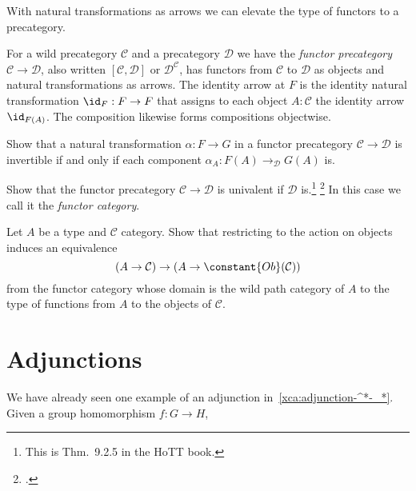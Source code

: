 With natural transformations as arrows we can elevate the
type of functors to a precategory.
\begin{definition}
  For a wild precategory $\mathcal C$ and a precategory $\mathcal D$
  we have the \emph{functor precategory}%
  $\mathcal C \to \mathcal D$, also written
  $[\mathcal C,\mathcal D]$ or $\mathcal D^{\mathcal C}$, %
  has functors from $\mathcal C$ to $\mathcal D$ as objects
  and natural transformations as arrows.
  The identity arrow at $F$ is the identity natural transformation
  $\id_F: F \to F$ that assigns to each object $A:\mathcal C$ the identity
  arrow $\id_{F(A)}$.
  The composition likewise forms compositions objectwise.
\end{definition}
\begin{xca}
  Show that a natural transformation $\alpha : F \to G$
  in a functor precategory $\mathcal C\to\mathcal D$
  is invertible if and only if
  each component $\alpha_A : F(A) \to_{\mathcal D} G(A)$ is.
\end{xca}
\begin{xca}
  Show that the functor precategory $\mathcal C\to\mathcal D$
  is univalent if $\mathcal D$ is.\footnote{%
    This is Thm.~9.2.5 in the HoTT book\footnotemark{}.}%
  \footcitetext{hottbook}
  In this case we call it the \emph{functor category}.
\end{xca}
\begin{xca}
  Let $A$ be a type and $\mathcal C$ category.
  Show that restricting to the action on objects
  induces an equivalence
  \[
    (A \to \mathcal C) \to (A \to \constant{Ob}(\mathcal C))
  \]
  from the functor category whose domain is the wild path category of $A$
  to the type of functions from $A$ to the objects of $\mathcal C$.
\end{xca}

\section{Adjunctions}
\label{sec:adjunctions}

We have already seen one example of an adjunction
in~\cref{xca:adjunction-^*-_*}.
Given a group homomorphism $f : G \to H$,



